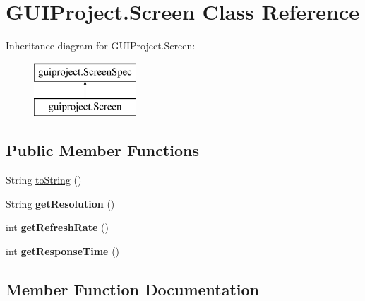 \hypertarget{class_g_u_i_project_1_1_screen}{}\section{G\+U\+I\+Project.\+Screen Class Reference}
\label{class_g_u_i_project_1_1_screen}
Inheritance diagram for G\+U\+I\+Project.\+Screen\+:\begin{figure}[H]
\begin{center}
\leavevmode
\includegraphics[height=2.000000cm]{class_g_u_i_project_1_1_screen}
\end{center}
\end{figure}
\subsection*{Public Member Functions}
\begin{DoxyCompactItemize}
\item 
String \mbox{\hyperlink{class_g_u_i_project_1_1_screen_ac4cd33c8a0752a8892b5e142e868e9f9}{to\+String}} ()
\item 
\mbox{\label{class_g_u_i_project_1_1_screen_a2730078a217be89dbe687a841e96766c}} 
String {\bfseries get\+Resolution} ()
\item 
\mbox{\label{class_g_u_i_project_1_1_screen_ad5d3d93f3a2e7e4a7ee7cbb48e03f45c}} 
int {\bfseries get\+Refresh\+Rate} ()
\item 
\mbox{\label{class_g_u_i_project_1_1_screen_a33d7f6b6357d438fa1c8e82df6281d71}} 
int {\bfseries get\+Response\+Time} ()
\end{DoxyCompactItemize}


\subsection{Member Function Documentation}
\mbox{\label{class_g_u_i_project_1_1_screen_ac4cd33c8a0752a8892b5e142e868e9f9}} 
